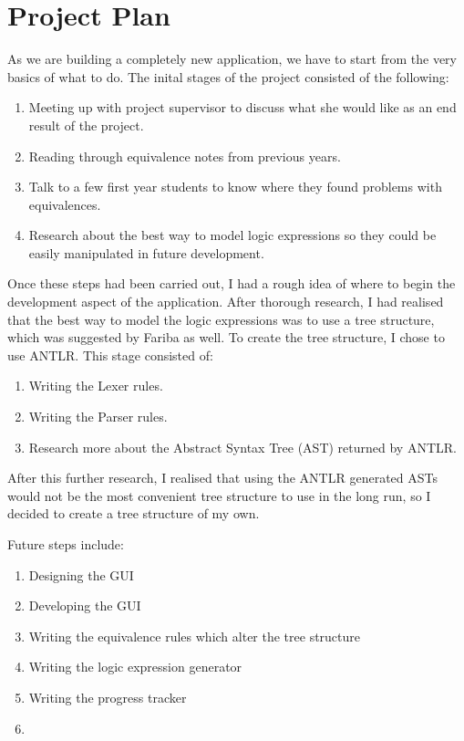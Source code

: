 \documentclass[11pt]{article}
\begin{document}
\section{Project Plan}
As we are building a completely new application, we have to start from the
very basics of what to do. The inital stages of the project consisted of the
following:
\begin{enumerate}
  \item Meeting up with project supervisor to discuss what she would like as
				an end result of the project.
	\item Reading through equivalence notes from previous years.
	\item Talk to a few first year students to know where they found problems
				with equivalences.
	\item Research about the best way to model logic expressions so they could
				be easily manipulated in future development.
\end{enumerate}

Once these steps had been carried out, I had a rough idea of where to begin 
the development aspect of the application. After thorough research, I had realised
that the best way to model the logic expressions was to use a tree structure, which
was suggested by Fariba as well. To create the tree structure, I chose to use
ANTLR. This stage consisted of:
\begin{enumerate}
	\item Writing the Lexer rules.
	\item Writing the Parser rules.
	\item Research more about the Abstract Syntax Tree (AST) returned by ANTLR.
\end{enumerate}

After this further research, I realised that using the ANTLR generated ASTs would
not be the most convenient tree structure to use in the long run, so I decided
to create a tree structure of my own.

Future steps include:
\begin{enumerate}
	\item Designing the GUI
	\item Developing the GUI
	\item Writing the equivalence rules which alter the tree structure
	\item Writing the logic expression generator
	\item Writing the progress tracker
	\item  	
\end{enumerate}
\end{document}
